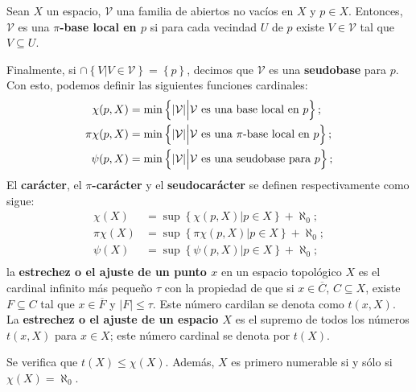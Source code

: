 \documentclass[12pt]{report}
\theoremstyle{largebreak}
\newcommand\abs[1]{\ensuremath{\lvert#1\rvert}}
\begin{document}
    \begin{mydef}
        Sean $X$ un espacio, $\mathcal{V}$ una familia de abiertos no vacíos en $X$ y $p\in X$. Entonces, $\mathcal{V}$ es una \textbf{$\pi$-base local en $p$} si para cada vecindad $U$ de $p$ existe $V\in\mathcal{V}$ tal que $V\subseteq U$.

        Finalmente, si $\cap\left\{V\Big|V\in\mathcal{V} \right\}=\left\{p \right\}$, decimos que $\mathcal{V}$ es una \textbf{seudobase} para $p$. Con esto, podemos definir las siguientes funciones cardinales:
        \begin{equation*}
            \begin{split}
                \chi(p,X)&=\min\left\{\abs{\mathcal{V}}\Big|\mathcal{V}\textup{ es una base local en }p \right\};\\
                \pi\chi(p,X)&=\min\left\{\abs{\mathcal{V}}\Big|\mathcal{V}\textup{ es una $\pi$-base local en }p \right\};\\
                \psi(p,X)&=\min\left\{\abs{\mathcal{V}}\Big|\mathcal{V}\textup{ es una seudobase para }p \right\};\\
            \end{split}
        \end{equation*}
        El \textbf{carácter}, el \textbf{$\pi$-carácter} y el \textbf{seudocarácter} se definen respectivamente como sigue:
        \begin{equation*}
            \begin{split}
                \chi(X)&=\sup\left\{\chi(p,X)\Big|p\in X \right\}+\aleph_0;\\
                \pi\chi(X)&=\sup\left\{\pi\chi(p,X)\Big|p\in X \right\}+\aleph_0;\\
                \psi(X)&=\sup\left\{\psi(p,X)\Big|p\in X \right\}+\aleph_0;\\
            \end{split}
        \end{equation*}
        la \textbf{estrechez o el ajuste de un punto $x$} en un espacio topológico $X$ es el cardinal infinito más pequeño $\tau$ con la propiedad de que si $x\in\overline{C}$, $C\subseteq X$, existe $F\subseteq C$ tal que $x\in\overline{F}$ y $\abs{F}\leq\tau$. Este número cardilan se denota como $t(x,X)$. La \textbf{estrechez o el ajuste de un espacio $X$} es el supremo de todos los números $t(x,X)$ para $x\in X$; este número cardinal se denota por $t(X)$.
    \end{mydef}

    \begin{obs}
        Se verifica que $t(X)\leq\chi(X)$. Además, $X$ es primero numerable si y sólo si $\chi(X)=\aleph_0$.
    \end{obs}
\end{document}
